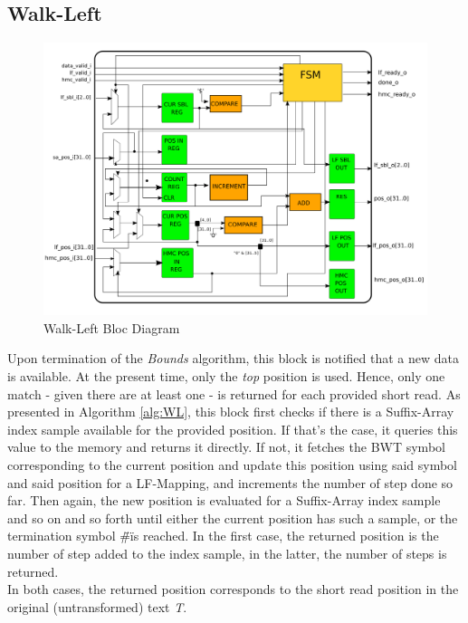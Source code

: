 \subsection{Walk-Left}

\begin{figure}[H]
    \centering
   \includegraphics[scale = 0.4]{Figures/WL_DIAG.png}
    \caption{Walk-Left Bloc Diagram}
    \label{fig:bounds_diag}
\end{figure}

Upon termination of the \textsl{Bounds} algorithm, this block is notified that a new data is available. At the present time, only the \textsl{top} position is used. Hence, only one match - given there are at least one - is returned for each provided short read. As presented in Algorithm \ref{alg:WL}, this block first checks if there is a Suffix-Array index sample available for the provided position. If that's the case, it queries this value to the memory and returns it directly. If not, it fetches the BWT symbol corresponding to the current position and update this position using said symbol and said position for a LF-Mapping, and increments the number of step done so far. Then again, the new position is evaluated for a Suffix-Array index sample and so on and so forth until either the current position has such a sample, or the termination symbol \"\#\" is reached.
In the first case, the returned position is the number of step added to the index sample, in the latter, the number of steps is returned. \\

In both cases, the returned position corresponds to the short read position in the original (untransformed) text \textsl{T}.


